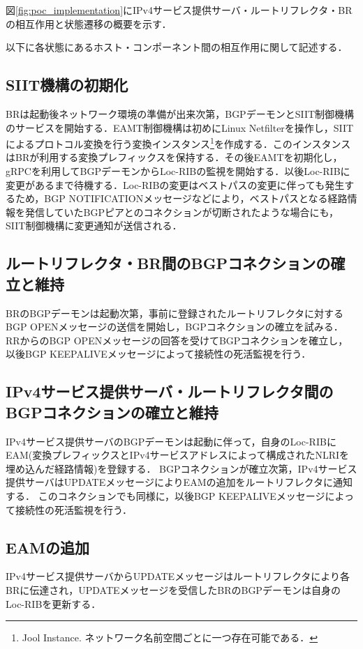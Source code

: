 図\ref{fig:poc_implementation}にIPv4サービス提供サーバ・ルートリフレクタ・BRの相互作用と状態遷移の概要を示す．

以下に各状態にあるホスト・コンポーネント間の相互作用に関して記述する．

\subsection{SIIT機構の初期化}
BRは起動後ネットワーク環境の準備が出来次第，BGPデーモンとSIIT制御機構のサービスを開始する．EAMT制御機構は初めにLinux Netfilterを操作し，SIITによるプロトコル変換を行う変換インスタンス\footnote{Jool Instance. ネットワーク名前空間ごとに一つ存在可能である．}を作成する．このインスタンスはBRが利用する変換プレフィックスを保持する．その後EAMTを初期化し，gRPCを利用してBGPデーモンからLoc-RIBの監視を開始する．以後Loc-RIBに変更があるまで待機する．Loc-RIBの変更はベストパスの変更に伴っても発生するため，BGP NOTIFICATIONメッセージなどにより，ベストパスとなる経路情報を発信していたBGPピアとのコネクションが切断されたような場合にも，SIIT制御機構に変更通知が送信される．


\subsection{ルートリフレクタ・BR間のBGPコネクションの確立と維持}
BRのBGPデーモンは起動次第，事前に登録されたルートリフレクタに対するBGP OPENメッセージの送信を開始し，BGPコネクションの確立を試みる．
RRからのBGP OPENメッセージの回答を受けてBGPコネクションを確立し，以後BGP KEEPALIVEメッセージによって接続性の死活監視を行う．



\subsection{IPv4サービス提供サーバ・ルートリフレクタ間のBGPコネクションの確立と維持}
IPv4サービス提供サーバのBGPデーモンは起動に伴って，自身のLoc-RIBにEAM(変換プレフィックスとIPv4サービスアドレスによって構成されたNLRIを埋め込んだ経路情報)を登録する．
BGPコネクションが確立次第，IPv4サービス提供サーバはUPDATEメッセージによりEAMの追加をルートリフレクタに通知する．
このコネクションでも同様に，以後BGP KEEPALIVEメッセージによって接続性の死活監視を行う．


\subsection{EAMの追加}
IPv4サービス提供サーバからUPDATEメッセージはルートリフレクタにより各BRに伝達され，UPDATEメッセージを受信したBRのBGPデーモンは自身のLoc-RIBを更新する．

